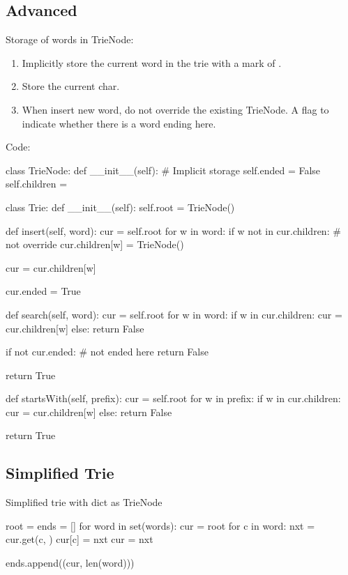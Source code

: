 \subsection{Advanced}
Storage of words in TrieNode: 
\begin{enumerate}
\item Implicitly store the current word in the trie with a mark of . 
\item Store the current char. 
\item When insert new word, do not override the existing TrieNode. A flag to indicate
whether there is a word ending here.
\end{enumerate}
\newpage
Code:
\begin{python}
class TrieNode:
    def __init__(self):
        # Implicit storage
        self.ended = False
        self.children = {}


class Trie:
    def __init__(self):
        self.root = TrieNode()

    def insert(self, word):
        cur = self.root
        for w in word:
            if w not in cur.children:   # not override
                cur.children[w] = TrieNode()

            cur = cur.children[w]

        cur.ended = True

    def search(self, word):
        cur = self.root
        for w in word:
            if w in cur.children:
                cur = cur.children[w]
            else:
                return False

        if not cur.ended:  # not ended here
            return False

        return True

    def startsWith(self, prefix):
        cur = self.root
        for w in prefix:
            if w in cur.children:
                cur = cur.children[w]
            else:
                return False

        return True
\end{python}
\subsection{Simplified Trie}
Simplified trie with dict as TrieNode
\begin{python}
root = {}
ends = []
for word in set(words):
    cur = root
    for c in word:
        nxt = cur.get(c, {})
        cur[c] = nxt
        cur = nxt

    ends.append((cur, len(word)))
\end{python}

